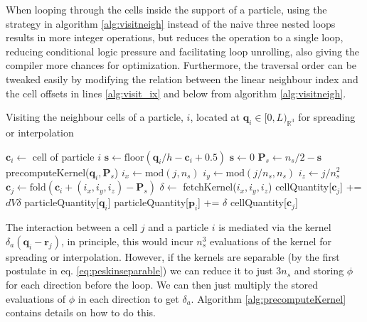 \documentclass[ twoside,openright,titlepage,numbers=noenddot,%
headinclude,footinclude,cleardoublepage=empty,abstract=on,
BCOR=5mm,paper=a4,fontsize=11pt, dvipsnames
]{scrreprt}
\renewcommand{\vec}[1]{\bm{#1}}
\newcommand{\floor}{\textrm{floor}}
\newcommand{\ppos}{q}
\newcommand{\fpos}{r}
\begin{document}
When looping through the cells inside the support of a particle, using the strategy in algorithm \ref{alg:visitneigh} instead of the naive three nested loops results in more integer operations, but reduces the operation to a single loop, reducing conditional logic pressure and facilitating loop unrolling, also giving the compiler more chances for optimization. Furthermore, the traversal order can be tweaked easily by modifying the relation between the linear neighbour index and the cell offsets in lines \ref{alg:visit_ix} and below from algorithm \ref{alg:visitneigh}.
\begin{algorithm}[H]
  \caption{Visiting the neighbour cells of a particle, $i$, located at $\vec{\ppos}_i \in [0, L)_{\mathbb R ^3}$ for spreading or interpolation}
  \label{alg:visitneigh}
  \begin{algorithmic}[1]
    \State $\vec{c}_i \gets$ cell of particle $i$ \label{alg:visitneighgetcell}
    \State $\vec{s} \gets \floor(\vec{\ppos}_i/h - \vec{c}_i + 0.5)$ 
    \Else
    \State $\vec{s} \gets 0$ 
    \EndIf
    \State $\vec{P}_s\gets n_s/2 -\vec{s}$ \label{alg:visitneighshift}
    \State precomputeKernel($\vec{\ppos}_i, \vec{P}_s$) 
    \State $i_x \gets \text{mod}(j, n_s)$\label{alg:visit_ix}
    \State $i_y \gets \text{mod}(j/n_s, n_s)$
    \State $i_z \gets j/n_s^2$
    \State $\vec{c}_j \gets \text{fold}(\vec{c}_i + (i_x, i_y, i_z) - \vec{P}_s)$ \Comment{Neighbour cell $\in [0, \vec{n})$}
    \State $\delta\gets$ fetchKernel($i_x, i_y, i_z$) \Comment{$\delta_a(\vec{q}_i - \vec{c}_j)$, see alg.\ref{alg:precomputeKernel}}
    \State cellQuantity[$\vec{c}_j$] += $dV\delta$ particleQuantity[$\vec{\ppos}_i$] \label{alg:visitspread}
    \State particleQuantity[$\vec{p}_i$] += $\delta$ cellQuantity[$\vec{c}_j$]\label{alg:visitinterp}
    \EndIf
    \EndFor
  \end{algorithmic}
\end{algorithm}

The interaction between a cell $j$ and a particle $i$ is mediated via the kernel $\delta_a(\vec{\ppos}_i-\vec{\fpos}_j)$, in principle, this would incur $n_s^3$ evaluations of the kernel for spreading or interpolation. However, if the kernels are separable (by the first postulate in eq. \eqref{eq:peskinseparable}) we can reduce it to just $3n_s$ and storing $\phi$ for each direction before the loop. We can then just multiply the stored evaluations of $\phi$ in each direction to get $\delta_a$. Algorithm \ref{alg:precomputeKernel} contains details on how to do this.
\end{document}

